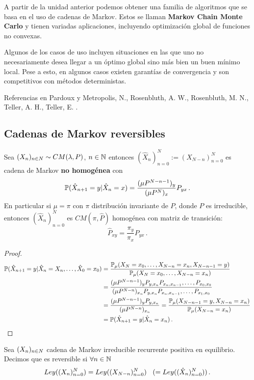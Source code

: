 A partir de la unidad anterior podemos obtener una familia de algoritmos que se basa en el uso de cadenas de Markov. Estos se llaman \textbf{Markov Chain Monte Carlo} y tienen variadas aplicaciones, incluyendo optimización global de funciones no convexas.

\newp Algunos de los casos de uso incluyen situaciones en las que uno no necesariamente desea llegar a un óptimo global sino más bien un buen mínimo local. Pese a esto, en algunos casos existen garantías de convergencia y son competitivos con métodos deterministas.

\newp Referencias en Pardoux \cite{pardoux} y Metropolis, N., Rosenbluth, A. W., Rosenbluth, M. N., Teller, A. H., Teller, E.  \cite{metro}.
\subsection{Cadenas de Markov reversibles} %
\begin{proposition}
\label{prop:4_1_1}
Sea $\xcm\sim\cm$, $n\in\N$ entonces $(\hat{X}_n)_{n=0}^N:=(X_{N-n})_{n=0}^N$ es cadena de Markov \textbf{no homogénea} con
$$ \P(\hat{X}_{n+1}=y|\hat{X}_n=x)=\displaystyle\frac{(\mu P^{N-n-1})_y}{(\mu P^N)_x}P_{yx} \, .$$
En particular si $\mu=\pi$ con $\pi$ distribución invariante de $P$, donde $P$ es irreducible, entonces $(\hat{X}_n)_{n=0}^N$ es $CM(\pi,\hat{P})$ homogénea con matriz de transición:
$$ \hat{P}_{xy}=\displaystyle\frac{\pi_y}{\pi_x}P_{yx} \, .$$
\end{proposition}
\begin{proof}
\gris
\begin{alignat*}{2}
    \P(\xhat_{n+1}=y|\xhat_{n}=X_n,\dots,\xhat_0=x_0) & = \displaystyle \frac{\P_\mu(X_N=x_0,\dots,X_{N-n}=x_n,X_{N-n-1}=y)}{\P_\mu(X_N=x_0,\dots,X_{N-n}=x_n)} \\
     & = \frac{(\mu P^{N-n-1})_yP_{y,x_n}P_{x_n,x_{n-1}},\dots,P_{x_0,x_0}}{(\mu P^{N-n})_{x_n}P_{y,x_n}P_{x_n,x_{n-1}},\dots,P_{x_1,x_0}} \\
     & =  \frac{(\mu P^{N-n-1})_yP_{y,x_n}}{(\mu P^{N-n})_{x_n}} = \frac{\P_\mu(X_{N-n-1}=y,X_{N-n}=x_n)}{\P_\mu(X_{N-n}=x_n)}\\
     & = \P(\hat{X}_{n+1}=y|\hat{X}_n=x_n) \, .
\end{alignat*}
\findem
\negro 
\end{proof}
\begin{definition}[Reversibilidad]
Sea $\xcm$ cadena de Markov irreducible recurrente positiva en equilibrio. Decimos que es reversible si $\forall n\in\N$
$$ Ley((X_n)_{n=0}^N)=Ley((X_{N-n})_{n=0}^N)\espacio(=Ley((\hat{X}_{n})_{n=0}^N)) \, .$$
\end{definition}
